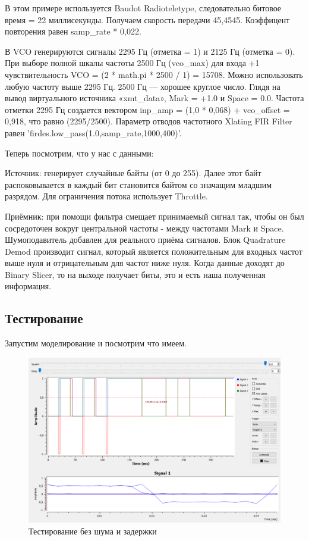 В этом примере используется Baudot Radioteletype, следовательно битовое время = 22 миллисекунды. Получаем скорость передачи 45,4545.
Коэффицент повторения равен samp\_rate * 0,022.

В VCO генерируются сигналы 2295 Гц (отметка = 1) и 2125 Гц (отметка = 0). При выборе полной шкалы частоты 2500 Гц (vco\_max) для входа +1 чувствительность VCO = (2 * math.pi * 2500 / 1) = 15708. Можно использовать любую частоту выше 2295 Гц. 2500 Гц — хорошее круглое число. Глядя на вывод виртуального источника «xmt\_data», Mark = +1.0 и Space = 0.0. Частота отметки 2295 Гц создается вектором inp\_amp = (1,0 * 0,068) + vco\_offset = 0,918, что равно (2295/2500). Параметр отводов частотного Xlating FIR Filter равен 'firdes.low\_pass(1.0,samp\_rate,1000,400)'.

Теперь посмотрим, что у нас с данными:

Источник:
генерирует случайные байты (от 0 до 255). Далее этот байт распоковывается в каждый бит становится байтом со значащим младшим разрядом. Для ограничения потока использует Throttle.

Приёмник:
при помощи фильтра смещает принимаемый сигнал так, чтобы он был сосредоточен вокруг центральной частоты - между частотами Mark и Space. Шумоподавитель добавлен для реального приёма сигналов. Блок Quadrature Demod производит сигнал, который является положительным для входных частот выше нуля и отрицательным для частот ниже нуля. Когда данные доходят до Binary Slicer, то на выходе получает биты, это и есть наша полученная информация.
\subsection{Тестирование}
Запустим моделирование и посмотрим что имеем.

    \begin{figure}[H]
	\begin{center}
		\includegraphics[scale=0.4]{fig/lab12/e1.png}
		\caption{Тестирование без шума и задержки}
		\label{pic:e1} %
	\end{center}
\end{figure}

